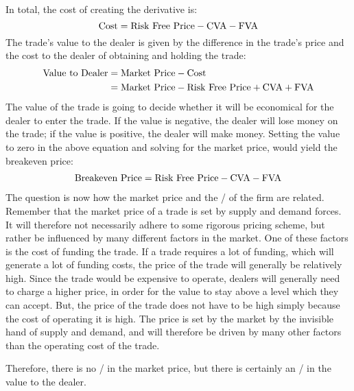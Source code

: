 \documentclass[main.tex]{subfiles}
\begin{document}
    In total, the cost of creating the derivative is:
        \begin{equation*}
            \text{Cost} = \text{Risk Free Price} - \CVA/ - \FVA/
        \end{equation*}
    The trade's value to the dealer is given by the difference in the trade's price
    and the cost to the dealer of obtaining and holding the trade:
        \begin{align*}
            \text{Value to Dealer} 
            &=
            \text{Market Price}
            -
            \text{Cost} 
            \\
            &= \text{Market Price} - \text{Risk Free Price} + \CVA/ + \FVA/
        \end{align*}
    The value of the trade is going to decide whether it will be economical 
    for the dealer to enter the trade. 
    If the value is negative, the dealer will lose money on the trade;
    if the value is positive, the dealer will make money.
    Setting the value to zero in the above equation and solving for the market price, 
    would yield the breakeven price:
        \begin{align*}
            \text{Breakeven Price}
            =
            \text{Risk Free Price} - \CVA/ - \FVA/
        \end{align*}
    The question is now how the market price and the \FVA/ of the firm are related.
    Remember that the market price of a trade is set by supply and demand forces.
    It will therefore not necessarily adhere to some rigorous pricing scheme,
    but rather be influenced by many different factors in the market.
    One of these factors is the cost of funding the trade.
    If a trade requires a lot of funding, which will generate a lot of funding costs,
    the price of the trade will generally be relatively high.
    Since the trade would be expensive to operate, 
    dealers will generally need to charge a higher price, 
    in order for the value to stay above a level which they can accept.
    But, the price of the trade does not have to be high 
    simply because the cost of operating it is high.
    The price is set by the market by the invisible hand of supply and demand,
    and will therefore be driven by many other factors than the operating cost of the trade.
    
    Therefore, there is no \FVA/ in the market price, 
    but there is certainly an \FVA/ in the value to the dealer.
\end{document}
